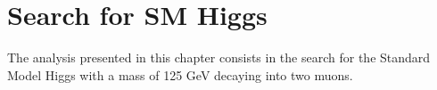 \chapter{Search for SM Higgs}
\label{Chapter4}

The analysis presented in this chapter consists in the search for the Standard Model Higgs with a mass of 125 GeV decaying into two muons.  \\



